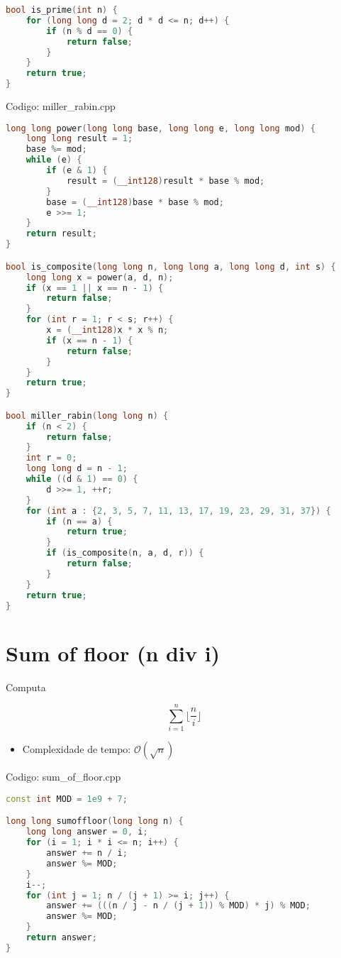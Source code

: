 \documentclass[10pt, a4paper, oneside]{book}
\begin{document}
\begin{lstlisting}[language=C++]
bool is_prime(int n) {
    for (long long d = 2; d * d <= n; d++) {
        if (n % d == 0) {
            return false;
        }
    }
    return true;
}
\end{lstlisting}
\hfill

Codigo: miller\_rabin.cpp

\begin{lstlisting}[language=C++]
long long power(long long base, long long e, long long mod) {
    long long result = 1;
    base %= mod;
    while (e) {
        if (e & 1) {
            result = (__int128)result * base % mod;
        }
        base = (__int128)base * base % mod;
        e >>= 1;
    }
    return result;
}

bool is_composite(long long n, long long a, long long d, int s) {
    long long x = power(a, d, n);
    if (x == 1 || x == n - 1) {
        return false;
    }
    for (int r = 1; r < s; r++) {
        x = (__int128)x * x % n;
        if (x == n - 1) {
            return false;
        }
    }
    return true;
}

bool miller_rabin(long long n) {
    if (n < 2) {
        return false;
    }
    int r = 0;
    long long d = n - 1;
    while ((d & 1) == 0) {
        d >>= 1, ++r;
    }
    for (int a : {2, 3, 5, 7, 11, 13, 17, 19, 23, 29, 31, 37}) {
        if (n == a) {
            return true;
        }
        if (is_composite(n, a, d, r)) {
            return false;
        }
    }
    return true;
}
\end{lstlisting}
\hfill

\section{Sum of floor (n div i)}


Computa



$$ \sum_{i=1}^{n} \lfloor\frac{n}{i}\rfloor $$





\begin{itemize}
\item Complexidade de tempo: $\mathcal{O}(\sqrt{n})$
\end{itemize}

\hfill

Codigo: sum\_of\_floor.cpp

\begin{lstlisting}[language=C++]
const int MOD = 1e9 + 7;

long long sumoffloor(long long n) {
    long long answer = 0, i;
    for (i = 1; i * i <= n; i++) {
        answer += n / i;
        answer %= MOD;
    }
    i--;
    for (int j = 1; n / (j + 1) >= i; j++) {
        answer += (((n / j - n / (j + 1)) % MOD) * j) % MOD;
        answer %= MOD;
    }
    return answer;
}
\end{lstlisting}
\hfill
\end{document}
